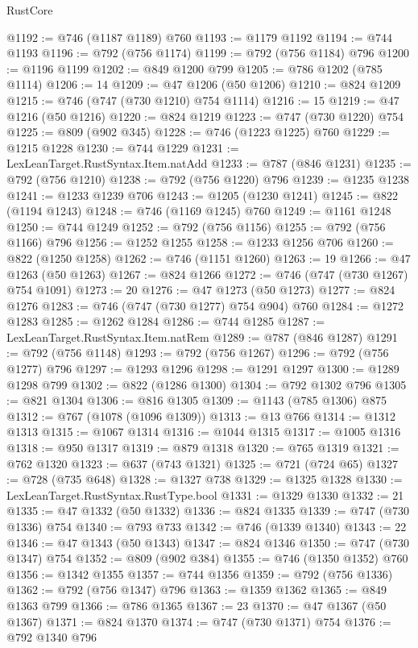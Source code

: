 \begin{lexlean}{RustCore}
\begin{coremodule}
@1192 := @746 (@1187 @1189) @760
@1193 := @1179 @1192
@1194 := @744 @1193
@1196 := @792 (@756 @1174)
@1199 := @792 (@756 @1184) @796
@1200 := @1196 @1199
@1202 := @849 @1200 @799
@1205 := @786 @1202 (@785 @1114)
@1206 := 14
@1209 := @47 @1206 (@50 @1206)
@1210 := @824 @1209
@1215 := @746 (@747 (@730 @1210) @754 @1114)
@1216 := 15
@1219 := @47 @1216 (@50 @1216)
@1220 := @824 @1219
@1223 := @747 (@730 @1220) @754
@1225 := @809 (@902 @345)
@1228 := @746 (@1223 @1225) @760
@1229 := @1215 @1228
@1230 := @744 @1229
@1231 := LexLeanTarget.RustSyntax.Item.natAdd
@1233 := @787 (@846 @1231)
@1235 := @792 (@756 @1210)
@1238 := @792 (@756 @1220) @796
@1239 := @1235 @1238
@1241 := @1233 @1239 @706
@1243 := @1205 (@1230 @1241)
@1245 := @822 (@1194 @1243)
@1248 := @746 (@1169 @1245) @760
@1249 := @1161 @1248
@1250 := @744 @1249
@1252 := @792 (@756 @1156)
@1255 := @792 (@756 @1166) @796
@1256 := @1252 @1255
@1258 := @1233 @1256 @706
@1260 := @822 (@1250 @1258)
@1262 := @746 (@1151 @1260)
@1263 := 19
@1266 := @47 @1263 (@50 @1263)
@1267 := @824 @1266
@1272 := @746 (@747 (@730 @1267) @754 @1091)
@1273 := 20
@1276 := @47 @1273 (@50 @1273)
@1277 := @824 @1276
@1283 := @746 (@747 (@730 @1277) @754 @904) @760
@1284 := @1272 @1283
@1285 := @1262 @1284
@1286 := @744 @1285
@1287 := LexLeanTarget.RustSyntax.Item.natRem
@1289 := @787 (@846 @1287)
@1291 := @792 (@756 @1148)
@1293 := @792 (@756 @1267)
@1296 := @792 (@756 @1277) @796
@1297 := @1293 @1296
@1298 := @1291 @1297
@1300 := @1289 @1298 @799
@1302 := @822 (@1286 @1300)
@1304 := @792 @1302 @796
@1305 := @821 @1304
@1306 := @816 @1305
@1309 := @1143 (@785 @1306) @875
@1312 := @767 (@1078 (@1096 @1309))
@1313 := @13 @766
@1314 := @1312 @1313
@1315 := @1067 @1314
@1316 := @1044 @1315
@1317 := @1005 @1316
@1318 := @950 @1317
@1319 := @879 @1318
@1320 := @765 @1319
@1321 := @762 @1320
@1323 := @637 (@743 @1321)
@1325 := @721 (@724 @65)
@1327 := @728 (@735 @648)
@1328 := @1327 @738
@1329 := @1325 @1328
@1330 := LexLeanTarget.RustSyntax.RustType.bool
@1331 := @1329 @1330
@1332 := 21
@1335 := @47 @1332 (@50 @1332)
@1336 := @824 @1335
@1339 := @747 (@730 @1336) @754
@1340 := @793 @733
@1342 := @746 (@1339 @1340)
@1343 := 22
@1346 := @47 @1343 (@50 @1343)
@1347 := @824 @1346
@1350 := @747 (@730 @1347) @754
@1352 := @809 (@902 @384)
@1355 := @746 (@1350 @1352) @760
@1356 := @1342 @1355
@1357 := @744 @1356
@1359 := @792 (@756 @1336)
@1362 := @792 (@756 @1347) @796
@1363 := @1359 @1362
@1365 := @849 @1363 @799
@1366 := @786 @1365
@1367 := 23
@1370 := @47 @1367 (@50 @1367)
@1371 := @824 @1370
@1374 := @747 (@730 @1371) @754
@1376 := @792 @1340 @796

\end{coremodule}
\end{lexlean}
